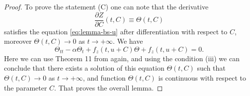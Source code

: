 \begin{proof}
	To prove the statement (C) one can note that the derivative
	\begin{equation}
		\dfrac{\partial Z}{\partial C}(t, C) \equiv \Theta(t, C)
	\end{equation}
	satisfies the equation \eqref{eq:lemma-bs-u} after differentiation with respect to $C$, moreover $\Theta(t, C) \to 0$ as $t \to +\infty$.
	We have
	\begin{equation}
		\Theta_{tt} - \alpha \Theta_t + f_z(t, u + C) \Theta + f_z(t, u + C) = 0.
	\end{equation}
	Here we can use Theorem 11 from \cite[Chapter 3]{Coppel} again, and using the condition (iii) we can conclude that there exists a solution of this equation $\Theta(t, C)$ such that $\Theta(t, C) \to 0$ as $t \to +\infty$, and function $\Theta(t, C)$ is continuous with respect to the parameter $C$.
	That proves the overall lemma.
\end{proof}
